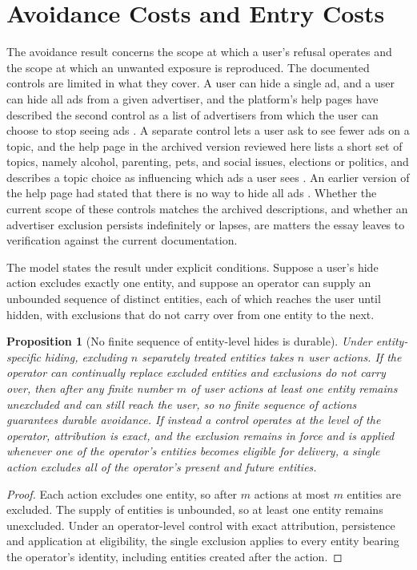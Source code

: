 \documentclass[11pt]{article}
\newtheorem{proposition}{Proposition}
\theoremstyle{definition}
\begin{document}
\section{Avoidance Costs and Entry Costs}

The avoidance result concerns the scope at which a user's refusal operates and the scope at which an unwanted exposure is reproduced. The documented controls are limited in what they cover. A user can hide a single ad, and a user can hide all ads from a given advertiser, and the platform's help pages have described the second control as a list of advertisers from which the user can choose to stop seeing ads \cite{fbhelp2021}. A separate control lets a user ask to see fewer ads on a topic, and the help page in the archived version reviewed here lists a short set of topics, namely alcohol, parenting, pets, and social issues, elections or politics, and describes a topic choice as influencing which ads a user sees \cite{fbhelp2021}. An earlier version of the help page had stated that there is no way to hide all ads \cite{fbhelp2015}. Whether the current scope of these controls matches the archived descriptions, and whether an advertiser exclusion persists indefinitely or lapses, are matters the essay leaves to verification against the current documentation.

The model states the result under explicit conditions. Suppose a user's hide action excludes exactly one entity, and suppose an operator can supply an unbounded sequence of distinct entities, each of which reaches the user until hidden, with exclusions that do not carry over from one entity to the next.

\begin{proposition}[No finite sequence of entity-level hides is durable]\label{prop:avoid}
Under entity-specific hiding, excluding $n$ separately treated entities takes $n$ user actions. If the operator can continually replace excluded entities and exclusions do not carry over, then after any finite number $m$ of user actions at least one entity remains unexcluded and can still reach the user, so no finite sequence of actions guarantees durable avoidance. If instead a control operates at the level of the operator, attribution is exact, and the exclusion remains in force and is applied whenever one of the operator's entities becomes eligible for delivery, a single action excludes all of the operator's present and future entities.
\end{proposition}

\begin{proof}
Each action excludes one entity, so after $m$ actions at most $m$ entities are excluded. The supply of entities is unbounded, so at least one entity remains unexcluded. Under an operator-level control with exact attribution, persistence and application at eligibility, the single exclusion applies to every entity bearing the operator's identity, including entities created after the action.
\end{proof}
\end{document}
